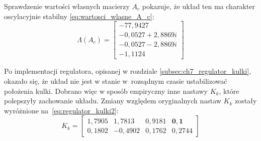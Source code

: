 Sprawdzenie wartości własnych macierzy $A_c$ pokazuje, że układ ten ma charakter oscylacyjnie stabilny \eqref{eq:wartosci_wlasne_A_c}:
\begin{equation}
    \Lambda(A_c) = \begin{bmatrix}
     -77,9427 \\
     -0,0527 + 2,8869i \\
     -0,0527 - 2,8869i \\
     -1,1124
    \end{bmatrix} \label{eq:wartosci_wlasne_A_c}
\end{equation}

Po implementacji regulatora, opisanej w rozdziale \ref{subsec:ch7_regulator_kulki}, okazało się, że układ nie jest w stanie w~rozsądnym czasie ustabilizować położenia kulki. Dobrano więc w sposób empiryczny inne nastawy $K_k$, które polepszyły zachowanie układu. Zmiany względem oryginalnych nastaw $K_k$ zostały wyróżnione na~\eqref{eq:regulator_kulki2}:
\begin{equation}
K_k = \begin{bmatrix}
    1,7905 &  1,7813 &  0,9181 &  \mathbf{0,1} \\
    0,1802 & -0,4902 &  0,1762 &  0,2744
\end{bmatrix} \label{eq:regulator_kulki2}
\end{equation}

